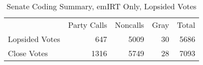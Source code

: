 \documentclass[12pt]{article}
\begin{document}
\begin{table}
	\caption{Senate Coding Summary, emIRT Only, Lopsided Votes}
	\centering
	\begin{tabular}{lrrrr}
		\hline
		& Party Calls & Noncalls & Gray & Total \\
		Lopsided Votes & 647 & 5009 & 30 & 5686 \\
		Close Votes & 1316 & 5749 & 28 & 7093 \\
		\hline
		
	\end{tabular}
\end{table}











	
	
\end{document}
